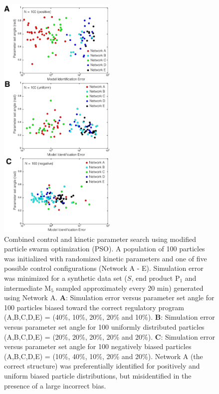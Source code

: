 \documentclass[12pt]{article}
\begin{document}
\begin{figure}
\centering
\includegraphics[width=0.5\textwidth]{./figs/Figure-7-ControlSearch.pdf}
\caption{Combined control and kinetic parameter search using modified particle swarm optimization (PSO). 
A population of 100 particles was initialized with randomized kinetic parameters and one of five possible control configurations (Network A - E).
Simulation error was minimized for a synthetic data set 
($S$, end product P$_{1}$ and intermediate M$_5$ sampled approximately every 20 min) generated using Network A.
\textbf{A}: Simulation error versus parameter set angle for 100 particles biased toward the correct regulatory program (A,B,C,D,E) = (40\%, 10\%, 20\%, 20\% and 10\%).
\textbf{B}: Simulation error versus parameter set angle for 100 uniformly distributed particles (A,B,C,D,E) = (20\%, 20\%, 20\%, 20\% and 20\%).
\textbf{C}: Simulation error versus parameter set angle for 100 negatively biased particles (A,B,C,D,E) = (10\%, 40\%, 10\%, 20\% and 20\%).
Network A (the correct structure) was preferentially identified for positively and uniform biased particle distributions, but misidentified in the presence of
a large incorrect bias. 
}\label{fig-control-search}
\end{figure}
\end{document}
